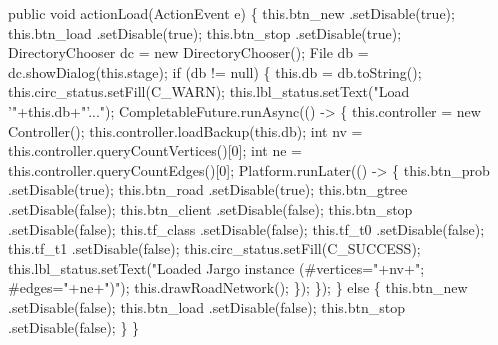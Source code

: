 \documentclass{article}
\def\nwendcode{\endtrivlist \endgroup}      %
\let\nwdocspar=\par
\begin{document}
\nwenddocs{}\endmoddef{}
public void actionLoad(ActionEvent e) \{
  this.btn_new      .setDisable(true);
  this.btn_load     .setDisable(true);
  this.btn_stop     .setDisable(true);
  DirectoryChooser dc = new DirectoryChooser();
  File db = dc.showDialog(this.stage);
  if (db != null) \{
    this.db = db.toString();
    this.circ_status.setFill(C_WARN);
    this.lbl_status.setText("Load '"+this.db+"'...");
    CompletableFuture.runAsync(() -> \{
      this.controller = new Controller();
      this.controller.loadBackup(this.db);
      int nv = this.controller.queryCountVertices()[0];
      int ne = this.controller.queryCountEdges()[0];
      Platform.runLater(() -> \{
        this.btn_prob     .setDisable(true);
        this.btn_road     .setDisable(true);
        this.btn_gtree    .setDisable(false);
        this.btn_client   .setDisable(false);
        this.btn_stop     .setDisable(false);
        this.tf_class     .setDisable(false);
        this.tf_t0        .setDisable(false);
        this.tf_t1        .setDisable(false);
        this.circ_status.setFill(C_SUCCESS);
        this.lbl_status.setText("Loaded Jargo instance (#vertices="+nv+"; #edges="+ne+")");
        this.drawRoadNetwork();
      \});
    \});
  \} else \{
    this.btn_new      .setDisable(false);
    this.btn_load     .setDisable(false);
    this.btn_stop     .setDisable(false);
  \}
\}
\nwendcode{}\nwdocspar
\end{document}
